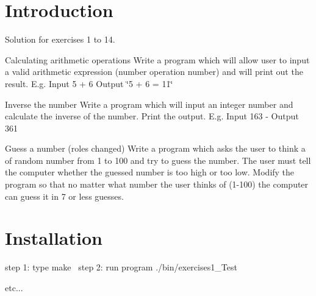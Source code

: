 \hypertarget{index_Introduction}{}\section{Introduction}\label{index_Introduction}
Solution for exercises 1 to 14.


\begin{DoxyEnumerate}
\item Calculating arithmetic operations Write a program which will allow user to input a valid arithmetic expression (number operation number) and will print out the result. E.\+g. Input 5 + 6 Output \char`\"{}5 + 6 = 11\char`\"{}
\item Inverse the number Write a program which will input an integer number and calculate the inverse of the number. Print the output. E.\+g. Input 163 -\/ Output 361
\item Guess a number (roles changed) Write a program which asks the user to think a of random number from 1 to 100 and try to guess the number. The user must tell the computer whether the guessed number is too high or too low. Modify the program so that no matter what number the user thinks of (1-\/100) the computer can guess it in 7 or less guesses.
\end{DoxyEnumerate}\hypertarget{index_Installation}{}\section{Installation}\label{index_Installation}
step 1\+: type make~\newline
step 2\+: run program ./bin/exercises1\+\_\+Test

etc... 
